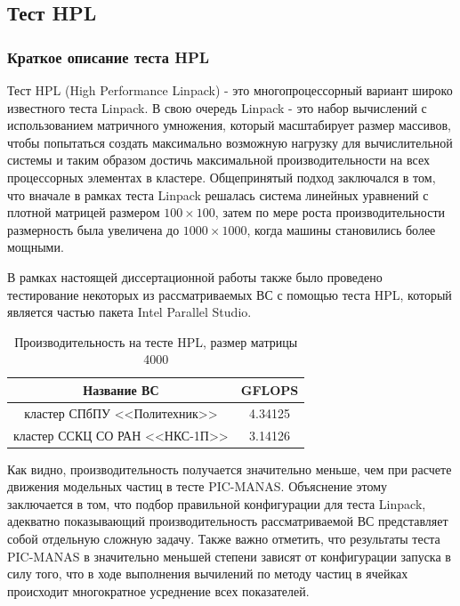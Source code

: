 \subsection{Тест HPL}

\subsubsection{Краткое описание теста HPL}
Тест HPL (High Performance Linpack) - это многопроцессорный вариант широко известного теста Linpack. В свою очередь Linpack - это набор вычислений с использованием матричного умножения, который масштабирует размер массивов, чтобы попытаться создать максимально возможную нагрузку для вычислительной системы и таким образом достичь максимальной производительности на всех процессорных элементах в кластере. Общепринятый подход заключался в том, что вначале в рамках теста Linpack решалась система линейных уравнений с плотной матрицей размером $ 100 \times 100$, затем по мере роста производительности размерность была увеличена до $1000 \times 1000$, когда машины становились более мощными.

В рамках настоящей диссертационной работы также было проведено тестирование некоторых из рассматриваемых ВС с помощью теста HPL, который является частью пакета Intel Parallel Studio. 

\begin{table}[ht]
\caption{Производительность на тесте HPL, размер матрицы 4000}
\begin{center}
\begin{tabular}{|c|c|}
	\hline
	Название ВС                & GFLOPS \\ \hline
кластер СПбПУ <<Политехник>>   &  4.34125 	          \\  
кластер ССКЦ СО РАН <<НКС-1П>> &  3.14126 	      \\ \hline
\end{tabular}
\end{center}
\label{}
\end{table}

Как видно, производительность получается значительно меньше, чем при расчете движения модельных частиц в тесте PIC-MANAS. Объяснение этому заключается  в том, что  подбор правильной конфигурации для теста Linpack, адекватно показывающий производительность рассматриваемой ВС представляет собой отдельную сложную задачу. Также важно отметить, что результаты теста PIC-MANAS в значительно меньшей степени зависят от конфигурации запуска в силу того, что в ходе выполнения вычилений по методу частиц в ячейках происходит многократное усреднение всех показателей.



